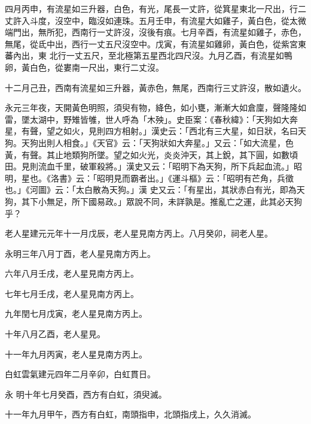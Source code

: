 \begin{pinyinscope}
 四月丙申，有流星如三升器，白色，有光，尾長一丈許，從箕星東北一尺出，行二丈許入斗度，沒空中，臨沒如連珠。五月壬申，有流星大如雞子，黃白色，從太微端門出，無所犯，西南行一丈許沒，沒後有痕。七月辛酉，有流星如雞子，赤色，無尾，從氐中出，西行一丈五尺沒空中。戊寅，有流星如雞卵，黃白色，從紫宮東蕃內出，東
 北行一丈五尺，至北極第五星西北四尺沒。九月乙酉，有流星如鴨卵，黃白色，從婁南一尺出，東行二丈沒。



 十二月己丑，西南有流星如三升器，黃赤色，無尾，西南行三丈許沒，散如遺火。



 永元三年夜，天開黃色明照，須臾有物，絳色，如小甕，漸漸大如倉廩，聲隆隆如雷，墜太湖中，野雉皆雊，世人呼為「木殃」。史臣案：《春秋緯》：「天狗如大奔星，有聲，望之如火，見則四方相射。」漢史云：「西北有三大星，如日狀，名曰天狗。天狗出則人相食。」《天官》云：「天狗狀如大奔星。」又云：「如大流星，色黃，有聲。其止地類狗所墜。望之如火光，炎炎沖天，其上銳，其下圓，如數頃田。見則流血千里，破軍殺將。」漢史又云：「昭明下為天狗，所下兵起血流。」昭明，星也。《洛書》云：「昭明見而霸者出。」《運斗樞》云：「昭明有芒角，兵徵也。」《河圖》云：「太白散為天狗。」漢
 史又云：「有星出，其狀赤白有光，即為天狗，其下小無足，所下國易政。」眾說不同，未詳孰是。推亂亡之運，此其必天狗乎？



 老人星建元元年十一月戊辰，老人星見南方丙上。八月癸卯，祠老人星。



 永明三年八月丁酉，老人星見南方丙上。



 六年八月壬戌，老人星見南方丙上。



 七年七月壬戌，老人星見南方丙上。



 九年閏七月戊寅，老人星見南方丙上。



 十年八月乙酉，老人星見。



 十一年九月丙寅，老人星見南方丙上。



 白虹雲氣建元四年二月辛卯，白虹貫日。



 永
 明十年七月癸酉，西方有白虹，須臾滅。



 十一年九月甲午，西方有白虹，南頭指申，北頭指戌上，久久消滅。




\end{pinyinscope}
